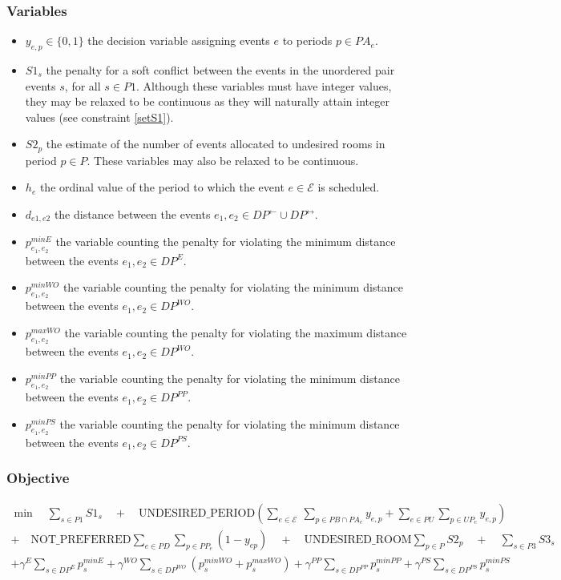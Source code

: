 \documentclass{article}
\newcommand{\E}{\mathcal{E}}
\begin{document}
\subsubsection*{Variables}
\begin{itemize}
    \item $y_{e, p} \in \{0,1\}$ the decision variable assigning events $e$ to
        periods $p \in PA_e$.
    \item $S1_s$ the penalty for a soft conflict between the events in the
        unordered pair events $s$, for all $s \in P1$. Although these variables
        must have integer values, they may be relaxed to be continuous as they
        will naturally attain integer values (see constraint \eqref{setS1}).
    \item $S2_p$ the estimate of the number of events allocated to undesired
        rooms in period $p \in P$. These variables may also be relaxed to be
        continuous.
    \item $h_e$ the ordinal value of the period to which the event $e \in \E$ is
        scheduled.
    \item $d_{e1, e2}$ the distance between the events $e_1, e_2 \in
        DP^{\leftarrow} \cup DP^{\leftrightarrow}$.
    \item $p_{e_1, e_2}^{minE}$ the variable counting the penalty for violating
        the minimum distance between the events $e_1, e_2 \in DP^E$.
    \item $p_{e_1, e_2}^{minWO}$ the variable counting the penalty for violating
        the minimum distance between the events $e_1, e_2 \in DP^{WO}$.
    \item $p_{e_1, e_2}^{maxWO}$ the variable counting the penalty for violating
        the maximum distance between the events $e_1, e_2 \in DP^{WO}$.
    \item $p_{e_1, e_2}^{minPP}$ the variable counting the penalty for violating
        the minimum distance between the events $e_1, e_2 \in DP^{PP}$.
    \item $p_{e_1, e_2}^{minPS}$ the variable counting the penalty for violating
        the minimum distance between the events $e_1, e_2 \in DP^{PS}$.
\end{itemize}

\subsubsection*{Objective}
\begin{multline}
    \min \quad \sum_{s \in P1} S1_s \quad + \quad \text{UNDESIRED\_PERIOD}
        \left( \sum_{e \in \E} \ \sum_{p \in PB \cap PA_e} y_{e, p} +
        \sum_{e \in PU} \sum_{p \in UP_e} y_{e, p} \right) \\
    + \quad \text{NOT\_PREFERRED} \sum_{e \in PD} \sum_{p \in PP_e} (1 - y_{ep})
        \quad + \quad \text{UNDESIRED\_ROOM} \sum_{p \in P} S2_p \quad + \quad
        \sum_{s \in P3} S3_s \\
    +  \gamma^E \sum_{s \in DP^E} p_s^{minE}  +  \gamma^{WO}
        \sum_{s \in DP^{WO}} \left(p_s^{minWO} + p_s^{maxWO}\right)  +
         \gamma^{PP} \sum_{s \in DP^{PP}} p_s^{minPP}  + 
        \gamma^{PS} \sum_{s \in DP^{PS}} p_s^{minPS}
\end{multline}
\end{document}
